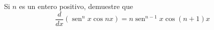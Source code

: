 \item Si $n$ es un entero positivo, demuestre que
$$\frac{d}{dx} (\operatorname{sen}^n x \cos nx) = n \operatorname{sen}^{n-1} x \cos(n+1)x$$
